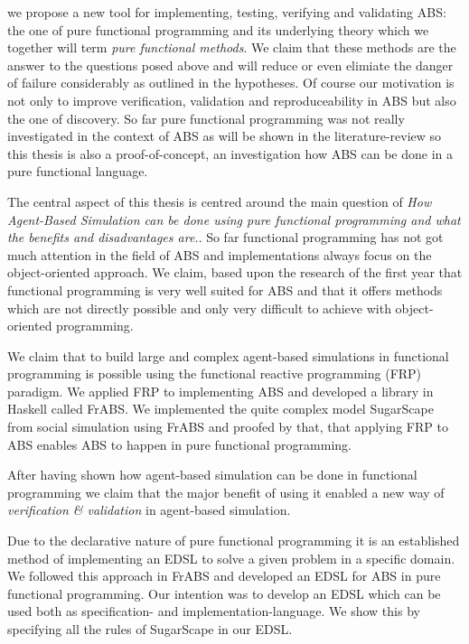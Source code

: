 we propose a new tool for implementing, testing, verifying and validating ABS: the one of pure functional programming and its underlying theory which we together will term \textit{pure functional methods}. We claim that these methods are the answer to the questions posed above and will reduce or even elimiate the danger of failure considerably as outlined in the hypotheses. 
Of course our motivation is not only to improve verification, validation and reproduceability in ABS but also the one of discovery. So far pure functional programming was not really investigated in the context of ABS as will be shown in the literature-review so this thesis is also a proof-of-concept, an investigation how ABS can be done in a pure functional language.

The central aspect of this thesis is centred around the main question of \textit{How Agent-Based Simulation can be done using pure functional programming and what the benefits and disadvantages are.}. So far functional programming has not got much attention in the field of ABS and implementations always focus on the object-oriented approach. We claim, based upon the research of the first year that functional programming is very well suited for ABS and that it offers methods which are not directly possible and only very difficult to achieve with object-oriented programming.

We claim that to build large and complex agent-based simulations in functional programming is possible using the functional reactive programming (FRP) paradigm. We applied FRP to implementing ABS and developed a library in Haskell called FrABS. We implemented the quite complex model SugarScape from social simulation using FrABS and proofed by that, that applying FRP to ABS enables ABS to happen in pure functional programming.

After having shown how agent-based simulation can be done in functional programming we claim that the major benefit of using it enabled a new way of \textit{verification \& validation} in agent-based simulation. 

Due to the declarative nature of pure functional programming it is an established method of implementing an EDSL to solve a given problem in a specific domain. We followed this approach in FrABS and developed an EDSL for ABS in pure functional programming. Our intention was to develop an EDSL which can be used both as specification- and implementation-language. We show this by specifying all the rules of SugarScape in our EDSL.

